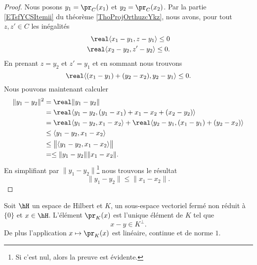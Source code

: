 \begin{proof}
    Nous posons \( y_1=\pr_C(x_1)\) et \( y_2=\pr_C(x_2)\). Par la partie \ref{ETsfYCSItemii} du théorème \ref{ThoProjOrthuzcYkz}, nous avons, pour tout \( z,z'\in C\) les inégalités
    \begin{subequations}
        \begin{align}
            \real\langle x_1-y_1, z-y_1\rangle \leq 0\\
            \real\langle x_2-y_2, z'-y_2\rangle \leq 0.
        \end{align}
    \end{subequations}
    En prenant \( z=y_2\) et \( z'=y_1\) et en sommant nous trouvons
    \begin{equation}
        \real\langle (x_1-y_1)+(y_2-x_2), y_2-y_1\rangle \leq 0.
    \end{equation}
    Nous pouvons maintenant calculer
    \begin{equation}
        \begin{aligned}[]
            \| y_1-y_2 \|^2&=\real\| y_1-y_2 \|\\
            &=\real\langle y_1-y_2, (y_1-x_1)+x_1-x_2+(x_2-y_2)\rangle \\
            &=\real\langle y_1-y_2, x_1-x_2\rangle +\real\langle y_2-y_1, (x_1-y_1)+(y_2-x_2)\rangle \\
            &\leq\langle y_1-y_2, x_1-x_2\rangle \\
            &\leq\big\| \langle y_1-y_2, x_1-x_2\rangle  \big\|\\
            &=\leq \| y_1-y_2 \|\| x_1-x_2 \|.
        \end{aligned}
    \end{equation}
    En simplifiant par \( \| y_1-y_2 \|\)\footnote{Si c'est nul, alors la preuve est évidente.} nous trouvons le résultat
    \begin{equation}
        \| y_1-y_2 \|\leq \| x_1-x_2 \|.
    \end{equation}
\end{proof}

\begin{theorem}      \label{ThoMXwOjb}
    Soit \( \hH\) un espace de Hilbert et \( K\), un sous-espace vectoriel fermé non réduit à \( \{ 0 \}\) et \( x\in\hH\). L'élément \( \pr_K(x)\) est l'unique élément de \( K\) tel que
    \begin{equation}
        x-y\in K^{\perp}.
    \end{equation}
    De plus l'application \( x\mapsto\pr_K(x)\) est linéaire, continue et de norme \( 1\).
\end{theorem}

